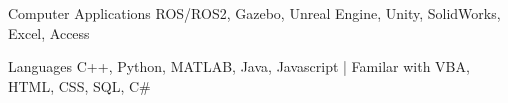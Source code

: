 
\begin{cvskills}
  \cvskill
    {Computer Applications} %
    {ROS/ROS2, Gazebo, Unreal Engine, Unity, SolidWorks, Excel, Access} %

  \cvskill
    {Languages} %
    {C++, Python, MATLAB, Java, Javascript | Familar with VBA, HTML, CSS, SQL, C\#} %
\end{cvskills}

